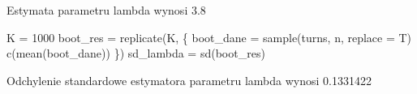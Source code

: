 \documentclass[
]{article}
\newenvironment{Shaded}{\begin{snugshade}}{\end{snugshade}}
\newcommand{\AttributeTok}[1]{\textcolor[rgb]{0.77,0.63,0.00}{#1}}
\newcommand{\DecValTok}[1]{\textcolor[rgb]{0.00,0.00,0.81}{#1}}
\newcommand{\FunctionTok}[1]{\textcolor[rgb]{0.00,0.00,0.00}{#1}}
\newcommand{\NormalTok}[1]{#1}
\newcommand{\OtherTok}[1]{\textcolor[rgb]{0.56,0.35,0.01}{#1}}
\begin{document}
Estymata parametru lambda wynosi 3.8

\begin{Shaded}
\begin{Highlighting}[]
\NormalTok{K }\OtherTok{=} \DecValTok{1000}
\NormalTok{boot\_res }\OtherTok{=} \FunctionTok{replicate}\NormalTok{(K, \{}
\NormalTok{  boot\_dane }\OtherTok{=} \FunctionTok{sample}\NormalTok{(turns, n, }\AttributeTok{replace =}\NormalTok{ T)}
  \FunctionTok{c}\NormalTok{(}\FunctionTok{mean}\NormalTok{(boot\_dane))}
\NormalTok{\})}
\NormalTok{sd\_lambda }\OtherTok{=} \FunctionTok{sd}\NormalTok{(boot\_res)}
\end{Highlighting}
\end{Shaded}

Odchylenie standardowe estymatora parametru lambda wynosi 0.1331422
\end{document}

